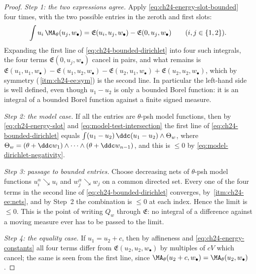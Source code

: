 \begin{proof}
\emph{Step 1: the two expressions agree.}  Apply
\eqref{eq:ch24-energy-slot-bounded} four times, with the two possible
entries in the zeroth and first slots:
\[
 \int u_i\,\MA_\theta(u_j,w_\bullet)
 =\mathfrak E(u_i,u_j,w_\bullet)-\mathfrak E(0,u_j,w_\bullet)
 \qquad (i,j\in\{1,2\}).
\]
Expanding the first line of \eqref{eq:ch24-bounded-dirichlet} into four such
integrals, the four terms $\mathfrak E(0,u_j,w_\bullet)$ cancel in pairs,
and what remains is
$\mathfrak E(u_1,u_1,w_\bullet)-\mathfrak E(u_1,u_2,w_\bullet)
 -\mathfrak E(u_2,u_1,w_\bullet)+\mathfrak E(u_2,u_2,w_\bullet)$, which by
symmetry (\,\cref{itm:ch24-ee:sym}) is the
second line.  In particular the left-hand side is well defined, even though
$u_1-u_2$ is only a bounded Borel function: it is an integral of a bounded
Borel function against a finite signed measure.

\emph{Step 2: the model case.}  If all the entries are $\theta$-psh model
functions, then by \eqref{eq:ch24-energy-slot} and
\eqref{eq:model-test-intersection} the first line of
\eqref{eq:ch24-bounded-dirichlet} equals
$\int(u_1-u_2)\,\ddc(u_1-u_2)\wedge\Theta_w$, where
$\Theta_w=(\theta+\ddc w_1)\wedge\cdots\wedge(\theta+\ddc w_{n-1})$, and
this is $\leq0$ by \eqref{eq:model-dirichlet-negativity}.

\emph{Step 3: passage to bounded entries.}  Choose decreasing nets of
$\theta$-psh model functions $u_i^\alpha\searrow u_i$ and
$w_j^\alpha\searrow w_j$ on a common directed set.  Every one of the four
terms in the second line of \eqref{eq:ch24-bounded-dirichlet} converges, by
\,\cref{itm:ch24-ee:nets}, and by Step~2 the
combination is $\leq0$ at each index.  Hence the limit is $\leq0$.  This
is the point of writing $Q_w$ through $\mathfrak E$: no integral of a
difference against a moving measure ever has to be passed to the limit.

\emph{Step 4: the equality case.}  If $u_1=u_2+c$, then by affineness and
\eqref{eq:ch24-energy-constants} all four terms differ from
$\mathfrak E(u_2,u_2,w_\bullet)$ by multiples of $cV$ which cancel; the
same is seen from the first line, since $\MA_\theta(u_2+c,w_\bullet)
=\MA_\theta(u_2,w_\bullet)$.
\end{proof}

